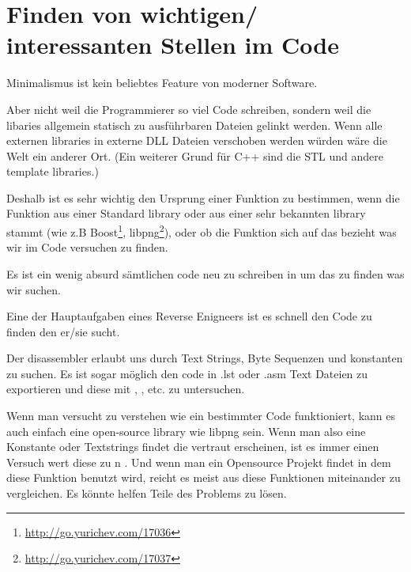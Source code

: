 \chapter{Finden von wichtigen/ interessanten Stellen im Code}

Minimalismus ist kein beliebtes Feature von moderner Software.


Aber nicht weil die Programmierer so viel Code schreiben, sondern weil die libaries allgemein statisch zu ausführbaren
Dateien gelinkt werden. 
Wenn alle externen libraries in externe DLL Dateien verschoben werden würden wäre die Welt ein anderer Ort.
(Ein weiterer Grund für C++ sind die \ac{STL} und andere template libraries.)

\newcommand{\FOOTNOTEBOOST}{\footnote{\url{http://go.yurichev.com/17036}}}
\newcommand{\FOOTNOTELIBPNG}{\footnote{\url{http://go.yurichev.com/17037}}}

Deshalb ist es sehr wichtig den Ursprung einer Funktion zu bestimmen, wenn die Funktion aus 
einer Standard library oder aus einer sehr bekannten library stammt (wie z.B Boost\FOOTNOTEBOOST, libpng\FOOTNOTELIBPNG),
oder ob die Funktion sich auf das bezieht was wir im Code versuchen zu finden.

Es ist ein wenig absurd sämtlichen code neu zu schreiben in \CCpp um das zu finden 
was wir suchen.

Eine der Hauptaufgaben eines Reverse Enigneers ist es schnell den Code zu finden den er/sie sucht. %

\myindex{\GrepUsage}

Der \IDA disassembler erlaubt uns durch Text Strings, Byte Sequenzen und konstanten zu suchen. %
Es ist sogar möglich den code in .lst oder .asm Text Dateien zu exportieren und diese mit , , etc. zu untersuchen.


Wenn man versucht zu verstehen wie ein bestimmter Code funktioniert, kann es auch einfach eine open-source library wie libpng sein. %
Wenn man also eine Konstante oder Textstrings findet die vertraut erscheinen, ist es immer einen Versuch wert diese zu n .
Und wenn man ein Opensource Projekt findet in dem diese Funktion benutzt wird, 
reicht es meist aus diese Funktionen miteinander zu vergleichen.
Es könnte helfen Teile des Problems zu lösen.

